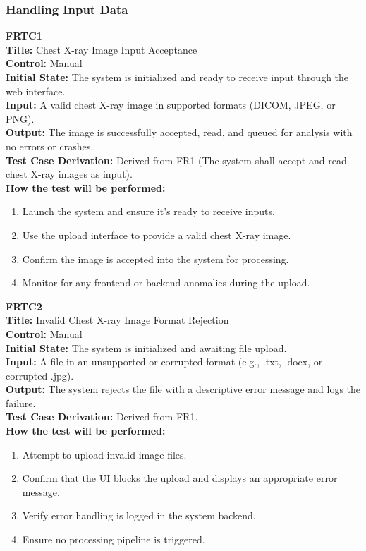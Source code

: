 \documentclass[12pt, titlepage]{article}
\begin{document}
\subsubsection{Handling Input Data}

\textbf{FRTC1}\\
\textbf{Title:} Chest X-ray Image Input Acceptance\\
\textbf{Control:} Manual\\
\textbf{Initial State:} The system is initialized and ready to receive input through the web interface.\\
\textbf{Input:} A valid chest X-ray image in supported formats (DICOM, JPEG, or PNG).\\
\textbf{Output:} The image is successfully accepted, read, and queued for analysis with no errors or crashes.\\
\textbf{Test Case Derivation:} Derived from FR1 (The system shall accept and read chest X-ray images as input).\\
\textbf{How the test will be performed:}
\begin{enumerate}
  \item Launch the system and ensure it's ready to receive inputs.
  \item Use the upload interface to provide a valid chest X-ray image.
  \item Confirm the image is accepted into the system for processing.
  \item Monitor for any frontend or backend anomalies during the upload.
\end{enumerate}

\vspace{1em}

\textbf{FRTC2}\\
\textbf{Title:} Invalid Chest X-ray Image Format Rejection\\
\textbf{Control:} Manual\\
\textbf{Initial State:} The system is initialized and awaiting file upload.\\
\textbf{Input:} A file in an unsupported or corrupted format (e.g., .txt, .docx, or corrupted .jpg).\\
\textbf{Output:} The system rejects the file with a descriptive error message and logs the failure.\\
\textbf{Test Case Derivation:} Derived from FR1.\\
\textbf{How the test will be performed:}
\begin{enumerate}
  \item Attempt to upload invalid image files.
  \item Confirm that the UI blocks the upload and displays an appropriate error message.
  \item Verify error handling is logged in the system backend.
  \item Ensure no processing pipeline is triggered.
\end{enumerate}
\end{document}
